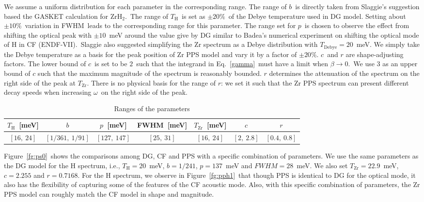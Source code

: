 \documentclass[review]{elsarticle}
\newcommand{\tcb}[1]{{#1}}
\begin{document}
\tcb{We assume a uniform distribution for each parameter in the corresponding range. The range of $b$\ is directly taken from Slaggie's suggestion based the GASKET calculation for ZrH$_2$\cite{Slaggie}.\ The range of $T_\mathrm{H}$\ is set as $\pm20\%$\ of the Debye temperature used in DG model. Setting about $\pm10\%$\ variation in FWHM\ leads to the corresponding range for this parameter. The range set for $p$\ is chosen to observe the effect from shifting the optical peak with $\pm10$\ meV around the value give by DG similar to Badea's numerical experiment on shifting the optical mode of H in CF (ENDF-VII)\cite{Badea}.\ Slaggie also suggested simplifying the Zr spectrum as a Debye distribution with $T_\mathrm{Debye}=20$\ meV. We simply take the Debye temperature as a basis for the peak position of Zr PPS model and vary it by a factor of $\pm20\%$. $c$\ and $r$ are shape-adjusting factors. The lower bound of $c$\ is set to be $2$\ such that the integrand in Eq.\ \eqref{gamma}\ must have a limit when $\beta\to0$\cite{Macf}.\ We  use $3$ as an upper bound of $c$ such that the maximum magnitude of the spectrum is reasonably bounded. $r$ determines the attenuation of the spectrum on the right side of the peak at $T_\mathrm{Zr}$. There is no physical basis for the range of $r$: we set it such that the Zr PPS spectrum can present different decay speeds when increasing $\omega$\ on the right side of the peak.} 

\begin{table}[h]
	\centering
	\caption{Ranges of the parameters}
	\label{tb:range}
	\hspace*{-1.5cm}\begin{tabular}{|c|c|c|c|c|c|c|}
		\hline
		$T_\mathrm{H}$\ [meV] & $b$& $p$\ [meV]& FWHM\ [meV]& $T_\mathrm{Zr}$\ [meV]& $c$& $r$\\
		\hline
		$[16,\ 24]$ & $[1/361,\ 1/91]$& $[127,\ 147]$& $[25,\ 31]$& $[16,\ 24]$& $[2,\ 2.8]$& $[0.4,\ 0.8]$\\
		\hline
		
	\end{tabular}
	
\end{table}



\tcb{Figure\ \ref{fg:ps0}\ shows the comparisons among DG, CF and PPS with a specific combination of parameters. We use the same parameters as the DG model for the H spectrum, i.e., $T_\mathrm{H}=20$\ meV, $b=1/241$, $p=137$\ meV and $FWHM=28$\ meV. We also set $T_\mathrm{Zr}=22.9$\ meV, $c=2.255$ and $r=0.7168$. For the H spectrum, we observe in Figure\ \ref{fg:pph1}\ that though PPS is identical to DG for the optical mode, it also has the flexibility of capturing some of the features of the CF acoustic mode. Also, with this specific combination of parameters, the Zr PPS model can roughly match the CF model in shape and magnitude.}
\end{document}
